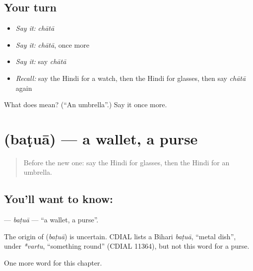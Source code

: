 \subsection*{Your turn}
\begin{itemize}
\raggedright
  \item \emph{Say it:} \emph{chātā}
  \item \emph{Say it:} \emph{chātā}, once more
  \item \emph{Say it:} say \emph{chātā}
  \item \emph{Recall:} say the Hindi for a watch, then the Hindi for glasses, then say \emph{chātā} again
\end{itemize}

\begin{tcolorbox}[breakable,colback=teal!4,colframe=teal!35!black,title={Before you move on}]
What does  mean? (\textquotedblleft{}An umbrella\textquotedblright{}.) Say it once more.
\end{tcolorbox}
\section[\texorpdfstring{\hi{बटुआ} (baṭuā)}{बटुआ (baṭuā)}]{ (baṭuā) — a wallet, a purse}

\label{lesson:HI-C133-batua}



\begin{quote}
Before the new one: say the Hindi for glasses, then the Hindi for an umbrella.
\end{quote}

\subsection*{You'll want to know: }
\textbf{} — \emph{baṭuā} — \textquotedblleft{}a wallet, a purse\textquotedblright{}.

\begin{cousinweb}
The origin of \textbf{} (\emph{baṭuā}) is uncertain. CDIAL lists a Bihari \emph{baṭuā}, \textquotedblleft{}metal dish\textquotedblright{}, under \emph{*vartu}, \textquotedblleft{}something round\textquotedblright{} (CDIAL 11364), but not this word for a purse.
\end{cousinweb}

\begin{grammarlens}[title={What you've built}]
One more word for this chapter.
\end{grammarlens}

